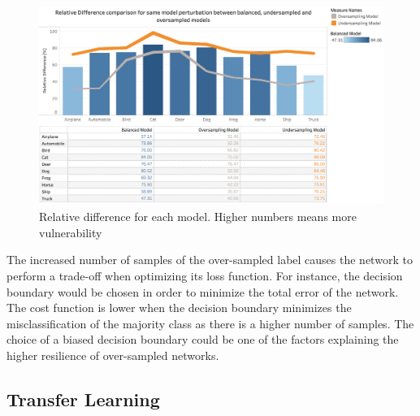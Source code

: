 \documentclass[runningheads,a4paper]{llncs}
\begin{document}
\begin{figure}
	\centering
	\includegraphics[height=6.5cm]{rel_diff_graph.png}
	\caption{Relative difference for each model. Higher numbers means more vulnerability}
	\label{fig:relative_difference}
\end{figure}


The increased number of samples of the over-sampled label causes the network to perform a trade-off when optimizing its loss function. For instance, the decision boundary would be chosen in order to minimize the total error of the network. The cost function is lower when the decision boundary minimizes the misclassification of the majority class as there is a higher number of samples. The choice of a biased decision boundary could be one of the factors explaining the higher resilience of over-sampled networks.

\subsection{Transfer Learning}
\end{document}
